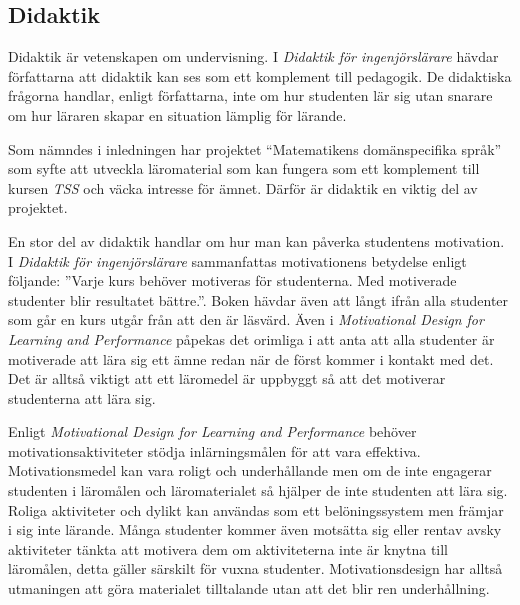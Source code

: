 \documentclass[]{article}
\begin{document}
\subsection{Didaktik}
Didaktik är vetenskapen om undervisning.
I \textit{Didaktik för ingenjörslärare} hävdar författarna att
didaktik kan ses som ett komplement till pedagogik.
De didaktiska frågorna handlar, enligt författarna,
inte om hur studenten lär sig utan snarare om hur läraren skapar en
situation lämplig för lärande.

Som nämndes i inledningen har projektet “Matematikens domänspecifika språk”
som syfte att utveckla läromaterial som kan fungera som ett komplement till
kursen \textit{TSS} och väcka intresse för ämnet.
Därför är didaktik en viktig del av projektet.

En stor del av didaktik handlar om hur man kan påverka studentens motivation.
I \textit{Didaktik för ingenjörslärare} sammanfattas motivationens betydelse
enligt följande: ”Varje kurs behöver motiveras för studenterna.
Med motiverade studenter blir resultatet bättre.”.
Boken hävdar även att långt ifrån alla studenter
som går en kurs utgår från att den är läsvärd.
Även i \textit{Motivational Design for Learning and Performance} påpekas det
orimliga i att anta att alla studenter är motiverade att lära sig ett ämne
redan när de först kommer i kontakt med det.
Det är alltså viktigt att ett läromedel är uppbyggt så att det motiverar
studenterna att lära sig.

Enligt \textit{Motivational Design for Learning and Performance} behöver
motivations\-aktiviteter stödja inlärningsmålen för att vara effektiva.
Motivationsmedel kan vara roligt och underhållande men om de inte engagerar
studenten i läromålen och läromaterialet så hjälper de inte studenten att
lära sig. Roliga aktiviteter och dylikt kan användas som ett belöningssystem
men främjar i sig inte lärande. Många studenter kommer även motsätta sig
eller rentav avsky aktiviteter tänkta att motivera dem om aktiviteterna
inte är knytna till läromålen, detta gäller särskilt för vuxna studenter.
Motivationsdesign har alltså utmaningen att göra materialet tilltalande
utan att det blir ren underhållning.
\end{document}
